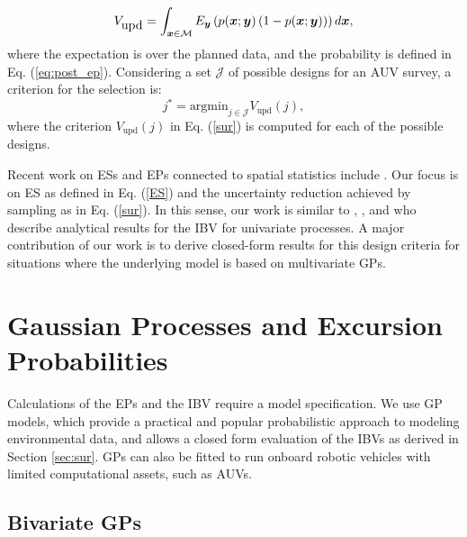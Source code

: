 \documentclass[aoas]{imsart}
\begin{document}
\begin{equation}\label{sur}
    V_{\mbox{upd}} = \int_{\bx \in \mathcal{M}} E_{\by} \left( p(\bx;\by)\left( 1-p(\bx;\by)\right) \right) d\bx, 
\end{equation}
where the expectation is over the planned data, and the probability is
defined in Eq. (\ref{eq:post_ep}).  Considering a set $\mathcal{J}$ of
possible designs for an AUV survey, a criterion for the selection is:
\begin{equation}\label{crit}
    j^* = \mbox{argmin}_{j \in \mathcal{J}} V_{\mbox{upd}}(j),
\end{equation}
where the criterion $V_{\mbox{upd}}(j)$ in Eq. (\ref{sur}) is computed
for each of the possible designs. 

Recent work on ESs and EPs connected to spatial statistics include
\cite{picheny2010,french2013spatio,bolin2015excursion,french2016credible}.
Our focus is on ES as defined in Eq. (\ref{ES}) and the uncertainty
reduction achieved by sampling as in Eq. (\ref{sur}). In this sense,
our work is similar to \cite{bect2012}, \cite{chevalier2014fast}, and
\cite{azzimonti2016quantifying} who describe analytical results for
the IBV for univariate processes. A major contribution of our work is
to derive closed-form results for this design criteria for situations
where the underlying model is based on multivariate GPs.

\section{Gaussian Processes and Excursion Probabilities}
\label{sec:GP_EP}

Calculations of the EPs and the IBV require a model specification. We
use GP models, which provide a practical and popular probabilistic
approach to modeling environmental data, and allows a closed form
evaluation of the IBVs as derived in Section \ref{sec:sur}. GPs can
also be fitted to run onboard robotic vehicles with limited
computational assets, such as AUVs.

\subsection{Bivariate GPs}
\end{document}
